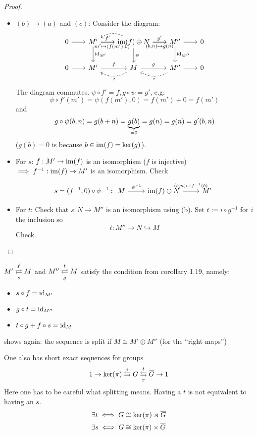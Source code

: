 \documentclass[a4paper]{report}
\begin{document}
\begin{thm-defi}
\begin{proof}
\begin{itemize}
      \item $(b) \to (a)$ and $(c)$: Consider the diagram:
            \[
\begin{tikzcd}[column sep= 20, row sep = 20]
0 \arrow[r] & M' \arrow[r, "f'"] \arrow[d, "\id_{M'}"] \arrow[r, "{\small \ \ \ \ m' \mps (f(m'),0)}"'] & \im(f) \oplus N \arrow[r, "g'"] \arrow[d, "\psi"] \arrow[l, dashed, bend right] \arrow[r, "{\small (b,n) \mps g(n)}"'] & M'' \arrow[r] \arrow[d, "\id_{M''}"]            & 0 \\
0 \arrow[r] & M' \arrow[r, "f"]                                                                 & M \arrow[r, "g"] \arrow[l, "?", dashed, bend left]                                                                     & M'' \arrow[r] \arrow[l, "?", dashed, bend left] & 0
\end{tikzcd}
            \]
            The diagram commutes. $\psi \circ f' = f, g \circ \psi = g'$, e.g: \[\psi \circ f'(m') = \psi(f(m'), 0) = f(m') + 0 = f(m')\] and
            \[g \circ \psi(b,n) = g(b+n) = \underbrace{g(b)}_{=0} = g(n) = g(n) = g'(b,n)\]
            ($g(b) = 0$ is because $b \in \operatorname{im}(f) = \ker(g)$).

      \item For $s$: $f: M' \to \operatorname{im}(f)$ is an isomorphism ($f$ is injective) $\implies f^{-1}: \operatorname{im}(f) \to M'$ is an isomorphism. Check
            \[s = (f^{-1},0) \circ \psi^{-1}: \begin{tikzcd}[row sep = 30]
M \arrow[r, "\psi^{-1}"] & \im(f) \oplus N \arrow[r, "{\begin{matrix}(b,n) \mps f^{-1}(b) \\ \end{matrix}}"] & M'
\end{tikzcd}\]
      \item For $t$: Check that $s : N \to M''$ is an isomorphism using (b). Set $t:= i \circ g^{-1}$ for $i$ the inclusion so \[t: M'' \to N \hookrightarrow M\]Check. \qedhere
\end{itemize}
  \end{proof}
\end{thm-defi}
\begin{rem*}
  $M' \overunderset fs \rightleftarrows M $ and $M'' \overunderset tg \rightleftarrows M $ satisfy the condition from corollary 1.19, namely:
  \begin{itemize}
    \item $s \circ f = \operatorname{id}_{M'}$
    \item $g \circ t = \operatorname{id}_{M''}$
    \item $t \circ g + f \circ s = \operatorname{id}_{M}$
  \end{itemize}
  shows again: the sequence is split if $M \cong M' \oplus M''$ (for the ``right maps'')
\end{rem*}
\begin{rem}
  One also has short exact sequences for groups
  \[1 \to \ker(\pi) \overset s \leftrightarrows G \overunderset t \pi \leftrightarrows \bar G \to 1\]
  Here one has to be careful what splitting means. Having a $t$ is not equivalent to having an $s$.
  \[\exists t \iff G \cong \ker(\pi) \rtimes \overline G\]
  \[\exists s \iff G \cong \ker(\pi) \times \overline G\]
\end{rem}
\end{document}
